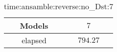 \begin{table}[!ht]
	\centering
	\begin{tabular}{|c|c|}
		\hline
		Models & $7$ \\ \hline
		elapsed & $794.27$ \\ \hline
	\end{tabular}
	\caption{time:ansamble:reverse:no_Dst:7}
	\label{tab:time:ansamble:reverse:no_Dst:7}
\end{table}
